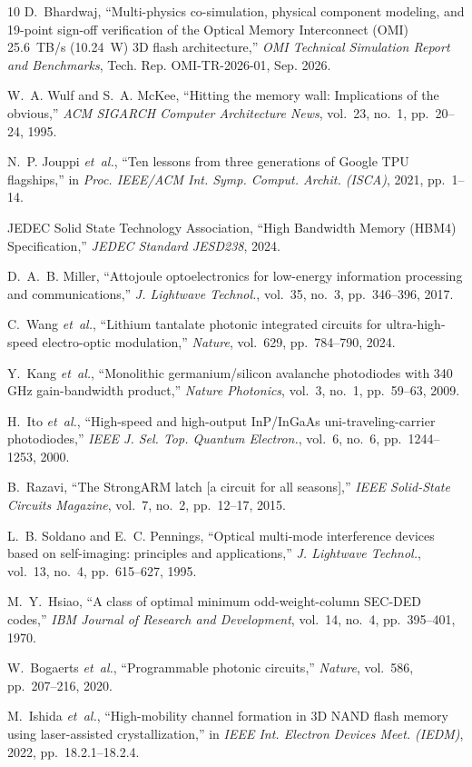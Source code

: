 \documentclass[journal]{IEEEtran}
\begin{document}
\begin{thebibliography}{10}
D.~Bhardwaj, ``Multi-physics co-simulation, physical component modeling, and 19-point sign-off verification of the Optical Memory Interconnect (OMI) 25.6~TB/s (10.24~W) 3D flash architecture,'' \emph{OMI Technical Simulation Report and Benchmarks}, Tech. Rep. OMI-TR-2026-01, Sep. 2026.

W.~A. Wulf and S.~A. McKee, ``Hitting the memory wall: Implications of the obvious,'' \emph{ACM SIGARCH Computer Architecture News}, vol.~23, no.~1, pp.~20--24, 1995.

N.~P. Jouppi \emph{et~al.}, ``Ten lessons from three generations of Google TPU flagships,'' in \emph{Proc. IEEE/ACM Int. Symp. Comput. Archit. (ISCA)}, 2021, pp.~1--14.

JEDEC Solid State Technology Association, ``High Bandwidth Memory (HBM4) Specification,'' \emph{JEDEC Standard JESD238}, 2024.

D.~A.~B. Miller, ``Attojoule optoelectronics for low-energy information processing and communications,'' \emph{J. Lightwave Technol.}, vol.~35, no.~3, pp.~346--396, 2017.

C.~Wang \emph{et~al.}, ``Lithium tantalate photonic integrated circuits for ultra-high-speed electro-optic modulation,'' \emph{Nature}, vol.~629, pp.~784--790, 2024.

Y.~Kang \emph{et~al.}, ``Monolithic germanium/silicon avalanche photodiodes with 340 GHz gain-bandwidth product,'' \emph{Nature Photonics}, vol.~3, no.~1, pp.~59--63, 2009.

H.~Ito \emph{et~al.}, ``High-speed and high-output InP/InGaAs uni-traveling-carrier photodiodes,'' \emph{IEEE J. Sel. Top. Quantum Electron.}, vol.~6, no.~6, pp.~1244--1253, 2000.

B.~Razavi, ``The StrongARM latch [a circuit for all seasons],'' \emph{IEEE Solid-State Circuits Magazine}, vol.~7, no.~2, pp.~12--17, 2015.

L.~B. Soldano and E.~C. Pennings, ``Optical multi-mode interference devices based on self-imaging: principles and applications,'' \emph{J. Lightwave Technol.}, vol.~13, no.~4, pp.~615--627, 1995.

M.~Y.~Hsiao, ``A class of optimal minimum odd-weight-column SEC-DED codes,'' \emph{IBM Journal of Research and Development}, vol.~14, no.~4, pp.~395--401, 1970.

W.~Bogaerts \emph{et~al.}, ``Programmable photonic circuits,'' \emph{Nature}, vol.~586, pp.~207--216, 2020.

M.~Ishida \emph{et~al.}, ``High-mobility channel formation in 3D NAND flash memory using laser-assisted crystallization,'' in \emph{IEEE Int. Electron Devices Meet. (IEDM)}, 2022, pp.~18.2.1--18.2.4.
\end{thebibliography}
\end{document}
